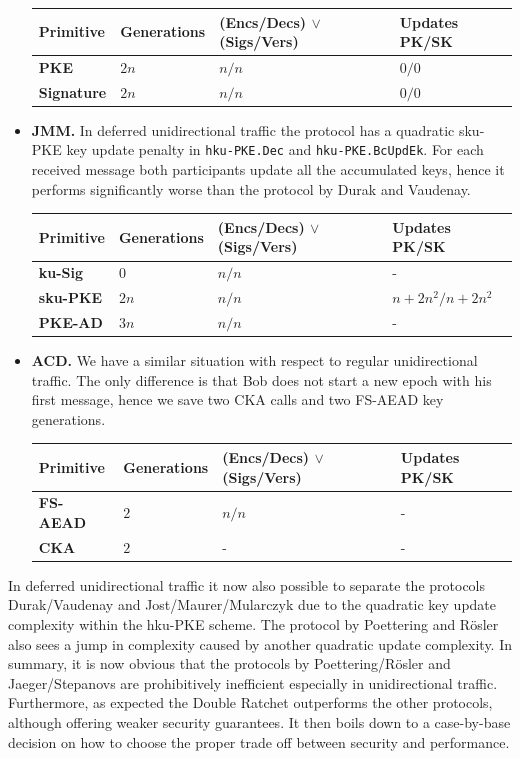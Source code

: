 \documentclass[11pt,a4paper,twoside,openright,bibliography=totoc]{scrbook}
\begin{document}
\begin{itemize}
\begin{center}
    \begin{tabular}{ | l | l | l | l |}
    \hline
    Primitive & Generations & (Encs/Decs) $\vee$ (Sigs/Vers) & Updates PK/SK \\ \hline
    \textbf{PKE} & $2n$ & $n/n$ & $0/0$ \\ \hline
    \textbf{Signature} & $2n$ & $n/n$ & $0/0$ \\  
    \hline
    \end{tabular}
  \end{center}
\item \textbf{JMM.} In deferred unidirectional traffic the protocol
  has a quadratic sku-PKE key update penalty in \texttt{hku-PKE.Dec} and
  \texttt{hku-PKE.BcUpdEk}. For each received message
  both participants update all the accumulated keys, hence it performs
  significantly worse than the protocol by Durak and Vaudenay.
  \begin{center}
    \begin{tabular}{ | l | l | l | l |}
    \hline
    Primitive & Generations & (Encs/Decs) $\vee$ (Sigs/Vers) & Updates PK/SK \\ \hline
    \textbf{ku-Sig} & $0$ & $n/n$ & - \\ \hline
    \textbf{sku-PKE} & $2n$ & $n/n$ & $n+2n^2/n+2n^2$ \\ \hline
    \textbf{PKE-AD} & $3n$ & $n/n$ & - \\
    \hline
    \end{tabular}
  \end{center}
\item \textbf{ACD.} We have a similar situation with respect to regular
  unidirectional traffic. The only difference is that Bob does not
  start a new epoch with his first message, hence we save two CKA calls
  and two FS-AEAD key generations.
  \begin{center}
    \begin{tabular}{ | l | l | l | l |}
    \hline
    Primitive & Generations & (Encs/Decs) $\vee$ (Sigs/Vers) & Updates PK/SK \\ \hline
    \textbf{FS-AEAD} & $2$ & $n/n$ & - \\ \hline
    \textbf{CKA} & $2$ & - & - \\  
    \hline
    \end{tabular}
  \end{center}
\end{itemize}

In deferred unidirectional traffic it now also possible to separate
the protocols Durak/Vaudenay and Jost/Maurer/Mularczyk due to
the quadratic key update complexity within the
hku-PKE scheme. The protocol by Poettering
and Rösler also sees a jump in complexity caused by another
quadratic update complexity. In summary, it is now obvious that
the protocols by Poettering/Rösler and Jaeger/Stepanovs are prohibitively
inefficient especially in unidirectional traffic. Furthermore,
as expected the Double Ratchet outperforms the other protocols,
although offering weaker security guarantees. It then boils down
to a case-by-base decision on how to choose the
proper trade off between security and performance.
\end{document}
